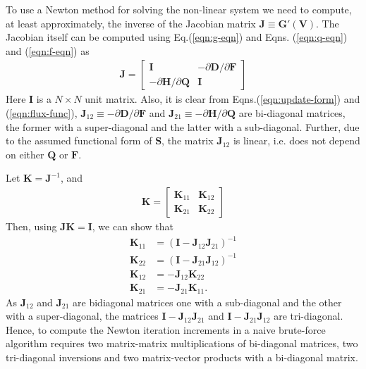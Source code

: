 \documentclass[11pt]{article}
\newcommand{\eqr}[1]{Eq.\thinspace(#1)}
\newcommand{\pfracb}[2]{\partial #1/\partial #2}
\newcommand{\mvec}[1]{\mathbf{#1}}
\begin{document}
To use a Newton method for solving the non-linear system we need to
compute, at least approximately, the inverse of the Jacobian matrix
$\mvec{J} \equiv \mvec{G}'(\mvec{V})$. The Jacobian itself can be
computed using \eqr{\ref{eqn:g-eqn}} and Eqns.\thinspace
(\ref{eqn:q-eqn}) and (\ref{eqn:f-eqn}) as
\begin{align}
  \mvec{J} =
  \left[
    \begin{array}{cc}
      \mvec{I} & -\pfracb{\mvec{D}}{\mvec{F}} \\
      -\pfracb{\mvec{H}}{\mvec{Q}} & \mvec{I}
    \end{array}
  \right]
\end{align}
Here $\mvec{I}$ is a $N\times N$ unit matrix. Also, it is clear from
Eqns.\thinspace (\ref{eqn:update-form}) and (\ref{eqn:flux-func}),
$\mvec{J}_{12} \equiv -\pfracb{\mvec{D}}{\mvec{F}}$ and $
\mvec{J}_{21} \equiv -\pfracb{\mvec{H}}{\mvec{Q}}$ are bi-diagonal
matrices, the former with a super-diagonal and the latter with a
sub-diagonal. Further, due to the assumed functional form of
$\mvec{S}$, the matrix $\mvec{J}_{12}$ is linear, i.e. does not depend
on either $\mvec{Q}$ or $\mvec{F}$.

Let $\mvec{K} = \mvec{J}^{-1}$, and
\begin{align}
  \mvec{K} = 
  \left[
    \begin{array}{cc}
      \mvec{K}_{11} & \mvec{K}_{12} \\
      \mvec{K}_{21} & \mvec{K}_{22}
    \end{array}
  \right]
\end{align}
Then, using $\mvec{J}\mvec{K} = \mvec{I}$, we can show that
\begin{align}
  \mvec{K}_{11} &= (\mvec{I} - \mvec{J}_{12}\mvec{J}_{21})^{-1} \\
  \mvec{K}_{22} &= (\mvec{I} - \mvec{J}_{21}\mvec{J}_{12})^{-1} \\
  \mvec{K}_{12} &= -\mvec{J}_{12} \mvec{K}_{22} \\
  \mvec{K}_{21} &= -\mvec{J}_{21} \mvec{K}_{11}.
\end{align}
As $\mvec{J}_{12}$ and $\mvec{J}_{21}$ are bidiagonal matrices one
with a sub-diagonal and the other with a super-diagonal, the matrices
$\mvec{I} - \mvec{J}_{12}\mvec{J}_{21}$ and $\mvec{I} -
\mvec{J}_{21}\mvec{J}_{12}$ are tri-diagonal. Hence, to compute the
Newton iteration increments in a naive brute-force algorithm requires
two matrix-matrix multiplications of bi-diagonal matrices, two
tri-diagonal inversions and two matrix-vector products with a
bi-diagonal matrix.
\end{document}
